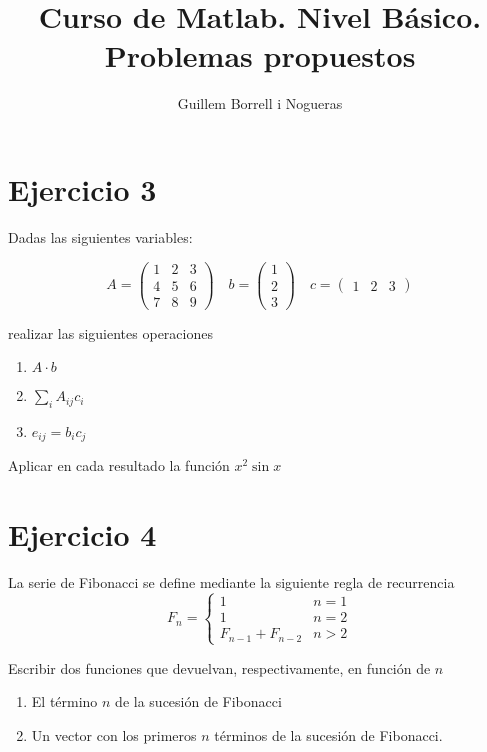 \documentclass[a4]{article}
\title{Curso de Matlab.  Nivel Básico. Problemas propuestos}
\author{Guillem Borrell i Nogueras}
\begin{document}

\maketitle

\section*{Ejercicio 3}
Dadas las siguientes variables:

\[
A = \left( \begin{array}{ccc}
1&2&3\\
4&5&6\\
7&8&9
\end{array} \right) \quad
b = \left( \begin{array}{c}
1\\2\\3
\end{array} \right) \quad
c = \left( \begin{array}{ccc}
1&2&3
\end{array} \right) 
\]

realizar las siguientes operaciones

\begin{enumerate}
\item $A\cdot b$
\item $\sum_i A_{ij}c_i$
\item $e_{ij}=b_ic_j$
\end{enumerate}

Aplicar en cada resultado la función $x^2 \sin x$

\section*{Ejercicio 4}

La serie de Fibonacci se define mediante la siguiente regla de recurrencia\[
F_{n}=\left\{ \begin{array}{cc}
1 & n=1\\
1 & n=2\\
F_{n-1}+F_{n-2} & n>2\end{array}\right.\]

Escribir dos funciones que devuelvan, respectivamente, en función de $n$

\begin{enumerate}
\item El término $n$ de la sucesión de Fibonacci
\item Un vector con los primeros $n$ términos de la sucesión de
  Fibonacci.
\end{enumerate}
\end{document}
